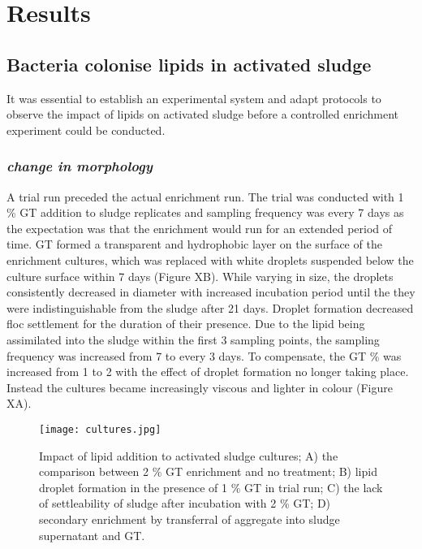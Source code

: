 \documentclass{article}
\begin{document}
\newpage
\section{Results}

\subsection{Bacteria colonise lipids in activated sludge}
It was essential to establish an experimental system and adapt protocols to observe the impact of lipids on activated sludge before a controlled enrichment experiment could be conducted. 

\subsubsection{\emph{change in morphology}}
A trial run preceded the actual enrichment run. The trial was conducted with 1 \% GT  addition to sludge replicates and sampling frequency was every 7 days as the expectation was that the enrichment would run for an extended period of time. GT formed a transparent and hydrophobic layer on the surface of the enrichment cultures, which was replaced with white droplets suspended below the culture surface within 7 days (Figure XB). While varying in size, the droplets consistently decreased in diameter with increased incubation period until the they were indistinguishable from the sludge after 21 days. Droplet formation decreased floc settlement for the duration of their presence. 
Due to the lipid being assimilated into the sludge within the first 3 sampling points, the sampling frequency was increased from 7 to every 3 days. To compensate, the GT \% was increased from 1 to 2 with the effect of droplet formation no longer taking place. Instead the cultures became increasingly viscous and lighter in colour (Figure XA). 
\begin{figure}
\texttt{[image: cultures.jpg]}
\caption{Impact of lipid addition to activated sludge cultures; A) the comparison between 2 \% GT enrichment and no treatment; B) lipid droplet formation in the presence of 1 \% GT in trial run; C) the lack of settleability of sludge after incubation with 2 \% GT; D) secondary enrichment by transferral of aggregate into sludge supernatant and GT.}
\end{figure}
\end{document}
